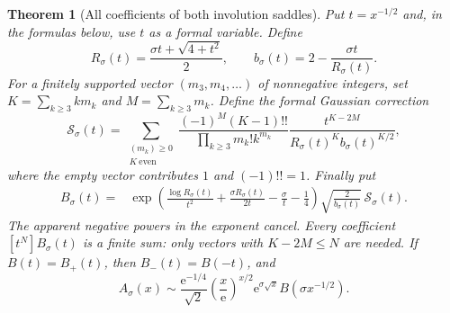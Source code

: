 \documentclass[11pt,a4paper]{article}
\numberwithin{equation}{section}
\newtheorem{theorem}{Theorem}[section]
\theoremstyle{definition}
\theoremstyle{remark}
\newcommand{\ee}{\mathrm e}
\begin{document}
\begin{theorem}[All coefficients of both involution saddles]
\label{thm:involution-coeff}
Put $t=x^{-1/2}$ and, in the formulas below, use $t$ as a formal variable. Define
\begin{equation}
 R_\sigma(t)=\frac{\sigma t+\sqrt{4+t^2}}2,
 \qquad b_\sigma(t)=2-\frac{\sigma t}{R_\sigma(t)}.
 \label{eq:involution-R}
\end{equation}
For a finitely supported vector $(m_3,m_4,\ldots)$ of nonnegative integers, set
$K=\sum_{k\ge3}km_k$ and $M=\sum_{k\ge3}m_k$. Define the formal Gaussian correction
\begin{equation}
 \mathcal S_\sigma(t)=
 \sum_{\substack{(m_k)\ge0\\K\ \mathrm{even}}}
 \frac{(-1)^M(K-1)!!}{\prod_{k\ge3}m_k!k^{m_k}}
 \frac{t^{K-2M}}{R_\sigma(t)^K b_\sigma(t)^{K/2}},
 \label{eq:involution-S}
\end{equation}
where the empty vector contributes $1$ and $(-1)!!=1$. Finally put
\begin{align}
 B_\sigma(t)={}&
 \exp\!\left(\frac{\log R_\sigma(t)}{t^2}
       +\frac{\sigma R_\sigma(t)}{2t}-\frac\sigma t-\frac14\right)
 \sqrt{\frac2{b_\sigma(t)}}\,\mathcal S_\sigma(t).
 \label{eq:involution-B}
\end{align}
The apparent negative powers in the exponent cancel. Every coefficient $[t^N]B_\sigma(t)$ is a finite sum: only vectors with $K-2M\le N$ are needed. If $B(t)=B_+(t)$, then $B_-(t)=B(-t)$, and
\begin{equation}
 A_\sigma(x)\sim
 \frac{\ee^{-1/4}}{\sqrt2}\left(\frac{x}{\ee}\right)^{x/2}
          \ee^{\sigma\sqrt x}B(\sigma x^{-1/2}).
 \label{eq:involution-saddle-expansion}
\end{equation}
\end{theorem}
\end{document}
